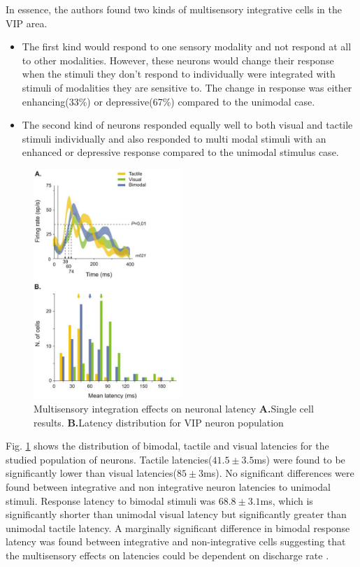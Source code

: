 \documentclass[10pt,oneside,final]{article}
\begin{document}
        In essence, the authors found two kinds of multisensory integrative cells in the VIP area. 
        \begin{itemize}
            \item{The first kind would respond to one sensory modality and not respond at all to other modalities. However, these neurons would change their response when the stimuli they don't respond to individually were integrated with stimuli of modalities they are sensitive to. The change in response was either enhancing(33\%) or depressive(67\%) compared to the unimodal case. }

            \item{The second kind of neurons responded equally well to both visual and tactile stimuli individually and also responded to multi modal stimuli with an enhanced or depressive response compared to the unimodal stimulus case.}
        \end{itemize}
        \begin{figure}[h!]
                \centering
                \includegraphics[width=0.5\textwidth]{schlack_latency.png}
                \caption{Multisensory integration effects on neuronal latency \textbf{A.}Single cell results. \textbf{B.}Latency distribution for VIP neuron population\cite{Avillac2007}}
                \label{fig:sch_lat}
        \end{figure}
        Fig. \ref{fig:sch_lat} shows the distribution of bimodal, tactile and visual latencies for the studied population of neurons. Tactile latencies($41.5 \pm 3.5$ms) were found to be significantly lower than visual latencies($85 \pm 3$ms). No significant differences were found between integrative and non integrative neuron latencies to unimodal stimuli. Response latency to bimodal stimuli was $68.8 \pm 3.1$ms, which is significantly shorter than unimodal visual latency but significantly greater than unimodal tactile latency. A marginally significant difference in bimodal response latency was found between integrative and non-integrative cells suggesting that the multisensory effects on latencies could be dependent on discharge rate \cite{Avillac2007}.
\end{document}
